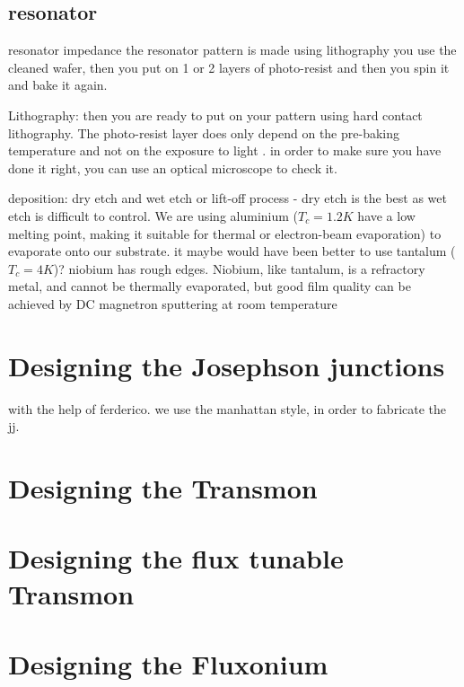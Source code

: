     \subsection{resonator}
        resonator impedance
        the resonator pattern is made using lithography you use the cleaned wafer, then you put on 1 or 2 layers of photo-resist and then you spin it and bake it again. 

        Lithography: 
            then you are ready to put on your pattern using hard contact lithography. The photo-resist layer does only depend on the pre-baking temperature and not on the exposure to light \cite{Schuster2007}. in order to make sure you have done it right, you can use an optical microscope to check it. 
        
        deposition: 
            dry etch and wet etch or lift-off process - dry etch is the best as wet etch is difficult to control. We are using aluminium ($T_c = 1.2 K$ have a low melting point, making it suitable for thermal or electron-beam evaporation) to evaporate onto our substrate.  it maybe would have been better to use tantalum ($T_c = 4 K$)? 
            niobium has rough edges. 
            Niobium, like tantalum, is a refractory metal, and cannot be thermally evaporated, but good film quality can be achieved by DC magnetron sputtering at room temperature
\section{Designing the Josephson junctions}
with the help of ferderico. we use the manhattan style, in order to fabricate the jj. 

\section{Designing the Transmon}

\section{Designing the flux tunable Transmon}

\section{Designing the Fluxonium}
    